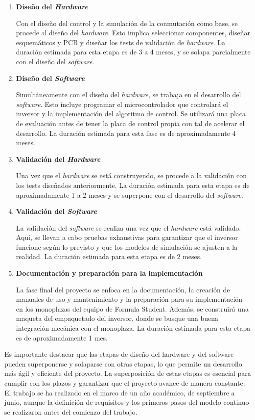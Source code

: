 \begin{enumerate}
\item \textbf{Diseño del \textit{Hardware}}

Con el diseño del control y la simulación de la conmutación como base, se procede al diseño del \textit{hardware}. Esto implica seleccionar componentes, diseñar esquemáticos y PCB y diseñar los tests de validación de \textit{hardware}. La duración estimada para esta etapa es de 3 a 4 meses, y se solapa parcialmente con el diseño del \textit{software}.

\item \textbf{Diseño del \textit{Software}}

Simultáneamente con el diseño del \textit{hardware}, se trabaja en el desarrollo del \textit{software}. Esto incluye programar el microcontrolador que controlará el inversor y la implementación del algoritmo de control. Se utilizará una placa de evaluación antes de tener la placa de control propia con tal de acelerar el desarrollo. La duración estimada para esta fase es de aproximadamente 4 meses.

\item \textbf{Validación del \textit{Hardware}}

Una vez que el \textit{hardware} se está construyendo, se procede a la validación con los tests diseñados anteriormente. La duración estimada para esta etapa es de aproximadamente 1 a 2 meses y se superpone con el desarrollo del \textit{software}.

\item \textbf{Validación del \textit{Software}}

La validación del \textit{software} se realiza una vez que el \textit{hardware} está validado. Aquí, se llevan a cabo pruebas exhaustivas para garantizar que el inversor funcione según lo previsto y que los modelos de simulación se ajusten a la realidad. La duración estimada para esta etapa es de 2 meses.

\item \textbf{Documentación y preparación para la implementación}

La fase final del proyecto se enfoca en la documentación, la creación de manuales de uso y mantenimiento y la preparación para su implementación en los monoplazas del equipo de Formula Student. Además, se construirá una maqueta del empaquetado del inversor, donde se busque una buena integración mecánica con el monoplaza. La duración estimada para esta etapa es de aproximadamente 1 mes. 

\end{enumerate}

Es importante destacar que las etapas de diseño del hardware y del software pueden superponerse y solaparse con otras etapas, lo que permite un desarrollo más ágil y eficiente del proyecto. La superposición de estas etapas es esencial para cumplir con los plazos y garantizar que el proyecto avance de manera constante. El trabajo se ha realizado en el marco de un año académico, de septiembre a junio, aunque la definición de requisitos y los primeros pasos del modelo continuo se realizaron antes del comienzo del trabajo.



